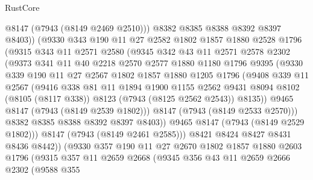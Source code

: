 \begin{lexlean}{RustCore}
\begin{coremodule}
                @8147
                (@7943 (@8149 @2469 @2510)))
              @8382
              @8385
              @8388
              @8392
              @8397
              @8403))
          (@9330
            @343
            @190
            @11
            @27
            @2582
            @1802
            @1857
            @1880
            @2528
            @1796
            (@9315
              @343
              @11
              @2571
              @2580
              (@9345
                @342
                @43
                @11
                @2571
                @2578
                @2302
                (@9373
                  @341
                  @11
                  @40
                  @2218
                  @2570
                  @2577
                  @1880
                  @1180
                  @1796
                  @9395
                  (@9330
                    @339
                    @190
                    @11
                    @27
                    @2567
                    @1802
                    @1857
                    @1880
                    @1205
                    @1796
                    (@9408
                      @339
                      @11
                      @2567
                      (@9416
                        @338
                        @81
                        @11
                        @1894
                        @1900
                        @1155
                        @2562
                        @9431
                        @8094
                        @8102
                        (@8105 (@8117 @338))
                        @8123
                        (@7943 (@8125 @2562 @2543))
                        @8135))
                    @9465
                    @8147
                    (@7943 (@8149 @2539 @1802)))
                  @8147
                  (@7943 (@8149 @2533 @2570)))
                @8382
                @8385
                @8388
                @8392
                @8397
                @8403))
            @9465
            @8147
            (@7943 (@8149 @2529 @1802)))
          @8147
          (@7943 (@8149 @2461 @2585)))
        @8421
        @8424
        @8427
        @8431
        @8436
        @8442))
    (@9330
      @357
      @190
      @11
      @27
      @2670
      @1802
      @1857
      @1880
      @2603
      @1796
      (@9315
        @357
        @11
        @2659
        @2668
        (@9345
          @356
          @43
          @11
          @2659
          @2666
          @2302
          (@9588
            @355

\end{coremodule}
\end{lexlean}
